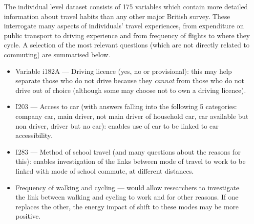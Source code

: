\documentclass[a4paper, 11pt, twoside]{Thesis}
\begin{document}
The individual level dataset consists of 175 variables which contain more
detailed information about travel habits than any other major British survey.
These interrogate many aspects of individuals' travel experiences, from
expenditure on public transport to driving experience and from frequency of
flights to where they cycle. A selection of the most relevant questions (which
are not directly related to
commuting) are summarised below.
\begin{itemize}
 \item  Variable i182A --- Driving licence (yes, no or provisional): this may
 help separate those who
 do not drive because they \emph{cannot} from those who do not drive out of
choice (although some may choose not to own a driving licence).
 \item I203 --- Access to car (with answers falling into the following 5
categories: company car, main driver, not main driver of household car, car
available but non driver, driver but no car): enables use of car to be linked
to car accessibility.
 \item I283 --- Method of school travel (and many questions about the reasons
for this): enables investigation of the links between mode of travel to work to
be linked with mode of school commute, at different distances.
 \item Frequency of walking and cycling --- would allow researchers to
investigate the link between walking and cycling to work and for other reasons.
If one replaces the other, the energy impact of shift to these modes may be
more positive.
\end{itemize}
\end{document}
